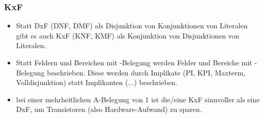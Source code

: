 \documentclass[10pt,a4paper]{scrartcl}
\begin{document}
\subsubsection{KxF}
\begin{itemize}
	\item Statt DxF (\ac{DNF}, \ac{DMF}) als Disjunktion von Konjunktionen von Literalen gibt es auch KxF (\ac{KNF}, \ac{KMF}) als Konjunktion von Disjunktionen von Literalen.
	\item Statt Feldern und Bereichen mit \grqq-Belegung werden Felder und Bereiche mit \grqq-Belegung beschrieben. Diese werden durch Implikate (\ac{PI}, \ac{KPI}, Maxterm, Volldisjunktion) statt Implikanten ($\ldots$) beschrieben.
	\item bei einer mehrheitlichen A-Belegung von 1 ist die/eine KxF sinnvoller als eine DxF, um Transistoren (also Hardware-Aufwand) zu sparen.
\end{itemize}

\newpage
\end{document}
